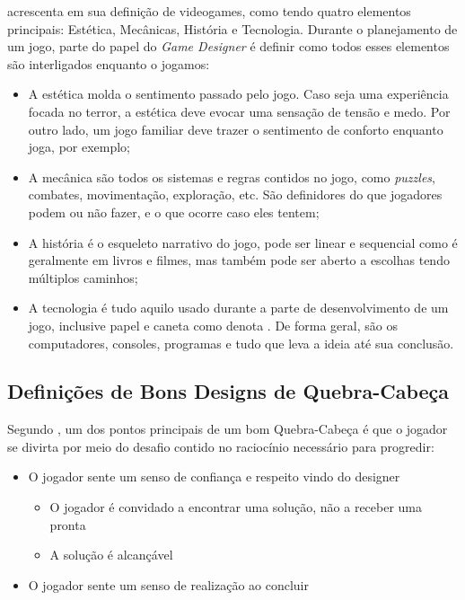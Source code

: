  acrescenta em sua definição de videogames, como tendo quatro elementos principais: Estética, Mecânicas, História e Tecnologia. Durante o planejamento de um jogo, parte do papel do \textit{Game Designer} é definir como todos esses elementos são interligados enquanto o jogamos:

\begin{itemize}
\item A estética molda o sentimento passado pelo jogo. Caso seja uma experiência focada no terror, a estética deve evocar uma sensação de tensão e medo. Por outro lado, um jogo familiar deve trazer o sentimento de conforto enquanto joga, por exemplo;
\item A mecânica são todos os sistemas e regras contidos no jogo, como \textit{puzzles}, combates, movimentação, exploração, etc. São definidores do que jogadores podem ou não fazer, e o que ocorre caso eles tentem;
\item A história é o esqueleto narrativo do jogo, pode ser linear e sequencial como é geralmente em livros e filmes, mas também pode ser aberto a escolhas tendo múltiplos caminhos;
\item A tecnologia é tudo aquilo usado durante a parte de desenvolvimento de um jogo, inclusive papel e caneta como denota . De forma geral, são os computadores, consoles, programas e tudo que leva a ideia até sua conclusão.
\end{itemize}

\subsection{Definições de Bons Designs de Quebra-Cabeça}

Segundo , um dos pontos principais de um bom Quebra-Cabeça é que o jogador se divirta por meio do desafio contido no raciocínio necessário para progredir:
\begin{citacao}
\begin{itemize}
    \item O jogador sente um senso de confiança e respeito vindo do designer
    \begin{itemize}
        \item O jogador é convidado a encontrar uma solução, não a receber uma pronta
        \item A solução é alcançável
    \end{itemize}
    \item O jogador sente um senso de realização ao concluir \cite[p. 9, tradução nossa]{GDCMenzel2016}
\end{itemize}
\end{citacao}


